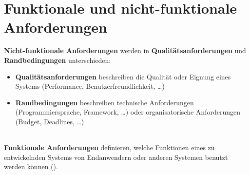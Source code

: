 \section{Funktionale und nicht-funktionale Anforderungen}

\begin{tcolorbox}[title=Funktionale und nicht-funktionale Anforderungen]
    \textbf{Nicht-funktionale Anforderungen} werden in \textbf{Qualitätsanforderungen} und \textbf{Randbedingungen} unterschieden:

    \begin{itemize}
        \item \textbf{Qualitätsanforderungen} beschreiben die Qualität oder Eignung eines Systems (Performance, Benutzerfreundlichkeit, \ldots)
        \item \textbf{Randbedingungen} beschreiben technische Anforderungen (Programmiersprache, Framework, \ldots) oder organisatorische Anforderungen (Budget, Deadlines, \ldots)
    \end{itemize}\\

    \noindent
    \textbf{Funktionale Anforderungen} definieren, welche Funktionen eines zu entwickelnden Systems von Endanwendern oder anderen Systemen benutzt werden können (\cite[66]{Wed09}).
\end{tcolorbox}